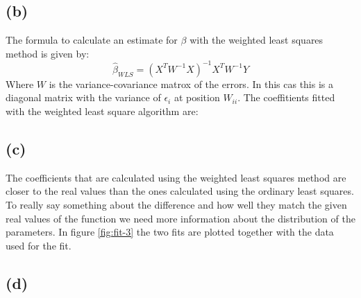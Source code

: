 \documentclass[a4paper]{article}
\begin{document}
\subsection*{(b)}
\noindent {}

The formula to calculate an estimate for $\beta$ with the weighted least squares method is given by:
\begin{equation}
	\hat{\beta}_{WLS} = (X^TW^{-1}X)^{-1} X^TW^{-1}Y
	\label{eq:WLS}
\end{equation}
Where $W$ is the variance-covariance matrox of the errors. In this cas this is a diagonal matrix with the variance of $\epsilon_i$ at position $W_{ii}$. The coeffitients fitted with the weighted least square algorithm are:


\subsection*{(c)}
\noindent {}

The coefficients that are calculated using the weighted least squares method are closer to the real values than the ones calculated using the ordinary least squares. To really say something about the difference and how well they match the given real values of the function we need more information about the distribution of the parameters.
In figure \ref{fig:fit-3} the two fits are plotted together with the data used for the fit.

\subsection*{(d)}
\noindent {}
\end{document}
